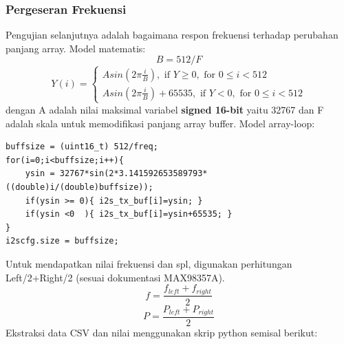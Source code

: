 \documentclass[12pt,]{article}
\begin{document}
  	\subsubsection{Pergeseran Frekuensi}
  	Pengujian selanjutnya adalah bagaimana respon frekuensi terhadap perubahan panjang array.
  	Model matematis:
  	\[ B = 512/F \]
  	\[
  	Y(i) = 
  	\begin{cases}
  	A sin(2 \pi \frac{i}{B}), \text{ if } Y \geq 0, \text{ for } 0 \leq i < 512\\ 
  	A sin(2 \pi \frac{i}{B})+65535, \text{ if } Y < 0, \text{ for } 0 \leq i < 512
  	\end{cases}
  	\]
  	dengan A adalah nilai maksimal variabel \textbf{signed 16-bit} yaitu 32767
  	dan F adalah skala untuk memodifikasi panjang array buffer.
  	Model array-loop:
  	\begin{verbatim}
buffsize = (uint16_t) 512/freq;
for(i=0;i<buffsize;i++){
	ysin = 32767*sin(2*3.141592653589793*((double)i/(double)buffsize));
	if(ysin >= 0){ i2s_tx_buf[i]=ysin; }
	if(ysin <0  ){ i2s_tx_buf[i]=ysin+65535; }
}
i2scfg.size = buffsize;
  	\end{verbatim}
  	Untuk mendapatkan nilai frekuensi dan spl, digunakan perhitungan Left/2+Right/2 (sesuai dokumentasi MAX98357A).
  	\[ f = \frac{f_{left} + f_{right}}{2}  \]
  	\[ P = \frac{P_{left} + P_{right}}{2}  \]
  	Ekstraksi data CSV dan nilai menggunakan skrip python semisal berikut:\\
  	 
		
\end{document}
